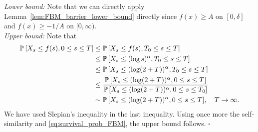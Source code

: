 \documentclass[11pt]{article}
\theoremstyle{plain}
\theoremstyle{definition}
\renewenvironment{proof}[1][] {\smallskip \noindent {\bf Proof#1.} }{\hspace*{\fill}$\square$\medskip\par}
\begin{document}
\begin{proof}
   \textit{Lower bound:} 
Note that we can directly apply Lemma~\ref{lem:FBM_barrier_lower_bound} directly since $f(x) \ge A$ on $[0,\delta]$ and $f(x) \ge -1/A$ on $[0,\infty)$.\\ 
\textit{Upper bound:} Note that
\begin{align*}
   {{{\bf {\mathbb{P}}}}\left[{X_s \le f(s), 0 \le s \le T}\right]} &\le {{{\bf {\mathbb{P}}}}\left[{X_s \le f(s), T_0 \le s \le T}\right]} \\
&\le {{{\bf {\mathbb{P}}}}\left[{X_s \le (\log s)^\alpha, T_0 \le s \le T}\right]} \\
&\le {{{\bf {\mathbb{P}}}}\left[{X_s \le (\log (2+T))^\alpha, T_0 \le s \le T}\right]} \\
&\le \frac{ {{{\bf {\mathbb{P}}}}\left[{X_s \le (\log (2+T))^\alpha, 0 \le s \le T}\right]}}{ {{{\bf {\mathbb{P}}}}\left[{X_s \le ( \log (2+T) )^\alpha, 0 \le s \le T_0}\right]}} \\
&\sim {{{\bf {\mathbb{P}}}}\left[{X_s \le ( \log (2+T) )^\alpha, 0 \le s \le T}\right]}, \quad T \to \infty.
\end{align*}
We have used Slepian's inequality in the last inequality. Using once more the self-similarity and \eqref{eq:survival_prob_FBM}, the upper bound follows.
\end{proof}
\end{document}
